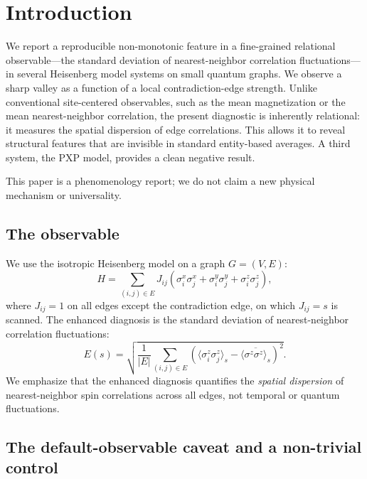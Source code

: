 \documentclass[aps,prb,reprint,superscriptaddress]{revtex4-2}
\begin{document}
\maketitle

\section{Introduction}

We report a reproducible non-monotonic feature in a fine-grained relational observable---the standard deviation of nearest-neighbor correlation fluctuations---in several Heisenberg model systems on small quantum graphs. We observe a sharp valley as a function of a local contradiction-edge strength. Unlike conventional site-centered observables, such as the mean magnetization or the mean nearest-neighbor correlation, the present diagnostic is inherently relational: it measures the spatial dispersion of edge correlations. This allows it to reveal structural features that are invisible in standard entity-based averages. A third system, the PXP model, provides a clean negative result.

This paper is a phenomenology report; we do not claim a new physical mechanism or universality.

\subsection{The observable}

We use the isotropic Heisenberg model on a graph $G=(V,E)$:
\begin{equation}
H = \sum_{(i,j)\in E} J_{ij}\left(\sigma_i^x\sigma_j^x + \sigma_i^y\sigma_j^y + \sigma_i^z\sigma_j^z\right),
\end{equation}
where $J_{ij}=1$ on all edges except the contradiction edge, on which $J_{ij}=s$ is scanned. The enhanced diagnosis is the standard deviation of nearest-neighbor correlation fluctuations:
\begin{equation}
E(s)=\sqrt{\frac{1}{|E|}\sum_{(i,j)\in E}\left(\langle\sigma_i^z\sigma_j^z\rangle_s-\overline{\langle\sigma^z\sigma^z\rangle_s}\right)^2}.
\end{equation}
We emphasize that the enhanced diagnosis quantifies the \emph{spatial dispersion} of nearest-neighbor spin correlations across all edges, not temporal or quantum fluctuations.

\subsection{The default-observable caveat and a non-trivial control}
\end{document}
